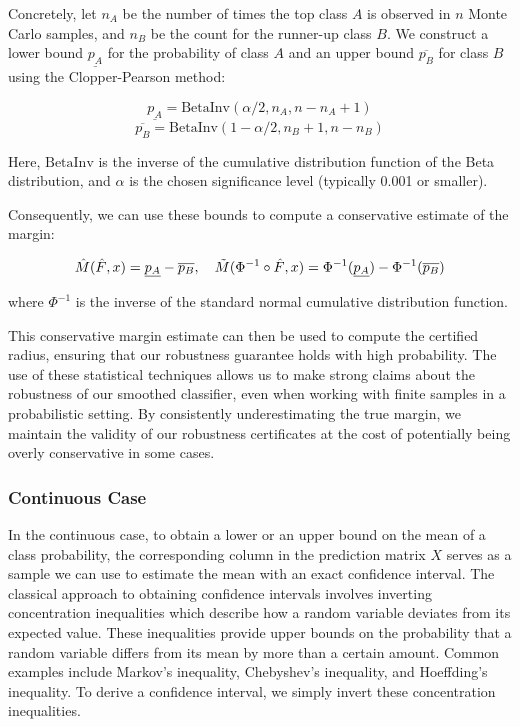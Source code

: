 Concretely, let $n_A$ be the number of times the top class $A$ is observed in $n$ Monte Carlo samples, and $n_B$ be the count for the runner-up class $B$.
We construct a lower bound $\underline{p_A}$ for the probability of class $A$ and an upper bound $\overline{p_B}$ for class $B$ using the Clopper-Pearson method:

\begin{equation}
    \underline{p_A} = \text{BetaInv}(\alpha/2, n_A, n - n_A + 1)
\end{equation}
\begin{equation}
    \overline{p_B} = \text{BetaInv}(1-\alpha/2, n_B + 1, n - n_B)
\end{equation}

Here, $\text{BetaInv}$ is the inverse of the cumulative distribution function of the Beta distribution, and $\alpha$ is the chosen significance level (typically 0.001 or smaller).

Consequently, we can use these bounds to compute a conservative estimate of the margin:

\begin{equation}
    \Hat{M}(\Hat{F},x)= \underline{p_A} - \overline{p_B}, \quad\tilde{M}(\Phi^{-1}\circ\Hat{F},x) = \Phi^{-1}(\underline{p_A}) - \Phi^{-1}(\overline{p_B})
\end{equation}

where $\Phi^{-1}$ is the inverse of the standard normal cumulative distribution function.

This conservative margin estimate can then be used to compute the certified radius, ensuring that our robustness guarantee holds with high probability.
The use of these statistical techniques allows us to make strong claims about the robustness of our smoothed classifier, even when working with finite samples in a probabilistic setting.
By consistently underestimating the true margin, we maintain the validity of our robustness certificates at the cost of potentially being overly conservative in some cases.

\subsubsection{Continuous Case}\label{subsubsec:continuous-case}
In the continuous case, to obtain a lower or an upper bound on the mean of a class probability, the corresponding column in the prediction matrix $X$ serves as a sample we can use to estimate the mean with an exact confidence interval.
The classical approach to obtaining confidence intervals involves inverting concentration inequalities which describe how a random variable deviates from its expected value.
These inequalities provide upper bounds on the probability that a random variable differs from its mean by more than a certain amount.
Common examples include Markov's inequality, Chebyshev's inequality, and Hoeffding's inequality.
To derive a confidence interval, we simply invert these concentration inequalities.

